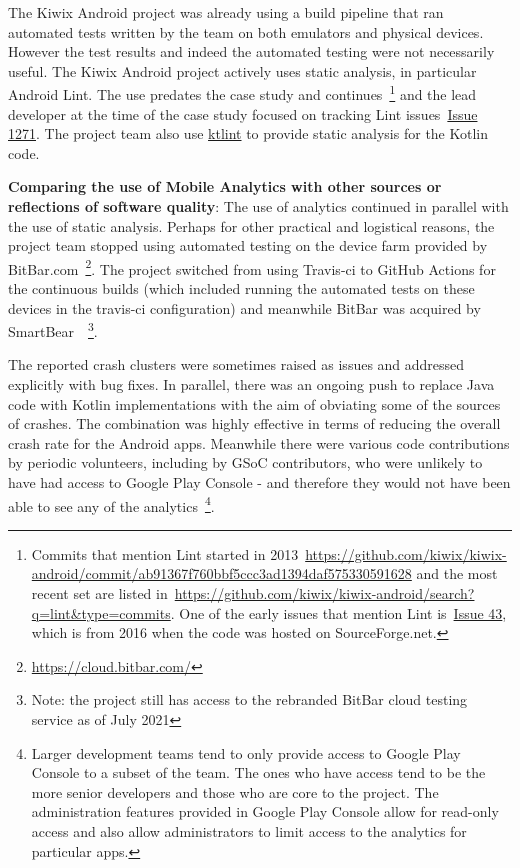 The Kiwix Android project was already using a build pipeline that ran automated tests written by the team on both emulators and physical devices. However the test results and indeed the automated testing were not necessarily useful. %
The Kiwix Android project actively uses static analysis, in particular Android Lint. The use predates the case study and continues~\footnote{Commits that mention Lint started in 2013~\url{https://github.com/kiwix/kiwix-android/commit/ab91367f760bbf5ccc3ad1394daf575330591628} and the most recent set are listed in~\url{https://github.com/kiwix/kiwix-android/search?q=lint&type=commits}. One of the early issues that mention Lint is~\href{https://github.com/kiwix/kiwix-android/issues/43}{Issue 43}, which is from 2016 when the code was hosted on SourceForge.net.} and the lead developer at the time of the case study focused on tracking Lint issues~\href{https://github.com/kiwix/kiwix-android/issues/1271}{Issue 1271}. The project team also use \href{https://ktlint.github.io/}{ktlint} to provide static analysis for the Kotlin code.

\textbf{Comparing the use of Mobile Analytics with other sources or reflections of software quality}: The use of analytics continued in parallel with the use of static analysis. Perhaps for other practical and logistical reasons, the project team stopped using automated testing on the device farm provided by BitBar.com~\footnote{\url{https://cloud.bitbar.com/}}. The project switched from using Travis-ci to GitHub Actions for the continuous builds (which included running the automated tests on these devices in the travis-ci configuration) and meanwhile BitBar was acquired by SmartBear~\citep{bitbar2019_smartbear_acquired_bitbar}~\footnote{Note: the project still has access to the rebranded BitBar cloud testing service as of  July 2021}.  

The reported crash clusters were sometimes raised as issues and addressed explicitly with bug fixes. In parallel, there was an ongoing push to replace Java code with Kotlin implementations with the aim of obviating some of the sources of crashes. The combination was highly effective in terms of reducing the overall crash rate for the Android apps. Meanwhile there were various code contributions by periodic volunteers, including by GSoC contributors, who were unlikely to have had access to Google Play Console - and therefore they would not have been able to see any of the analytics~\footnote{Larger development teams tend to only provide access to Google Play Console to a subset of the team. The ones who have access tend to be the more senior developers and those who are core to the project. The administration features provided in Google Play Console allow for read-only access and also allow administrators to limit access to the analytics for particular apps.}. 
  
